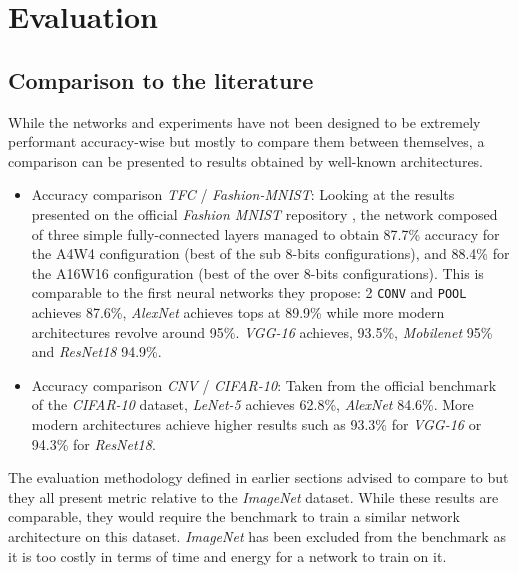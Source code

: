
\section{Evaluation}


\subsection{Comparison to the literature}

While the networks and experiments have not been designed to be extremely performant accuracy-wise but mostly to compare them between themselves, a comparison can be presented to results obtained by well-known architectures.

\begin{itemize}
  \item Accuracy comparison \emph{TFC} / \emph{Fashion-MNIST}: Looking at the results presented on the official \emph{Fashion MNIST} repository \cite{FashionMNISTRepo}, the network composed of three simple fully-connected layers managed to obtain 87.7\% accuracy for the A4W4 configuration (best of the sub 8-bits configurations), and 88.4\% for the A16W16 configuration (best of the over 8-bits configurations). This is comparable to the first neural networks they propose: 2 \texttt{CONV} and \texttt{POOL} achieves 87.6\%, \emph{AlexNet} achieves tops at 89.9\% while more modern architectures revolve around 95\%. \emph{VGG-16} achieves, 93.5\%, \emph{Mobilenet} 95\% and \emph{ResNet18} 94.9\%.
  \item Accuracy comparison \emph{CNV} / \emph{CIFAR-10}: Taken from the official benchmark of the \emph{CIFAR-10} dataset, \emph{LeNet-5} achieves 62.8\%, \emph{AlexNet} 84.6\%. More modern architectures achieve higher results such as 93.3\% for \emph{VGG-16} or 94.3\% for \emph{ResNet18}.
\end{itemize}

The evaluation methodology defined in earlier sections advised to compare to \cite{Jia2018, Micikevicius2017, Kurth2018} but they all present metric relative to the \emph{ImageNet} dataset. While these results are comparable, they would require the benchmark to train a similar network architecture on this dataset. \emph{ImageNet} has been excluded from the benchmark as it is too costly in terms of time and energy for a network to train on it.

